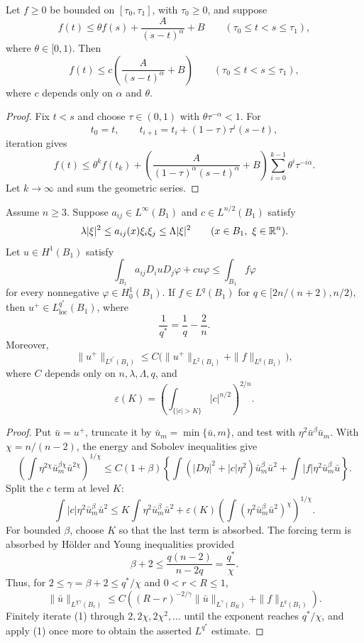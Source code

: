\begin{lemma}\label{hanlin:weaksol-part2-iteration-lemma}
Let $f\geq0$ be bounded on $[\tau_0,\tau_1]$, with $\tau_0\geq0$, and
suppose
\[
f(t)\leq\theta f(s)+\frac{A}{(s-t)^\alpha}+B
\qquad(\tau_0\leq t<s\leq\tau_1),
\]
where $\theta\in[0,1)$. Then
\[
f(t)\leq c\left(\frac{A}{(s-t)^\alpha}+B\right)
\qquad(\tau_0\leq t<s\leq\tau_1),
\]
where $c$ depends only on $\alpha$ and $\theta$.
\end{lemma}
\begin{proof}
\sketch Fix $t<s$ and choose $\tau\in(0,1)$ with
$\theta\tau^{-\alpha}<1$. For
\[
t_0=t,\qquad
t_{i+1}=t_i+(1-\tau)\tau^i(s-t),
\]
iteration gives
\[
f(t)\leq\theta^kf(t_k)+
\left(\frac{A}{(1-\tau)^\alpha(s-t)^\alpha}+B\right)
\sum_{i=0}^{k-1}\theta^i\tau^{-i\alpha}.
\]
Let $k\to\infty$ and sum the geometric series.
\end{proof}

\begin{theorem}\label{hanlin:weaksol-part2-high-integrability}
Assume $n\geq3$. Suppose $a_{ij}\in L^\infty(B_1)$ and
$c\in L^{n/2}(B_1)$ satisfy
\[
\lambda|\xi|^2\leq a_{ij}(x)\xi_i\xi_j\leq\Lambda|\xi|^2
\qquad(x\in B_1,\ \xi\in\mathbb{R}^n).
\]
Let $u\in H^1(B_1)$ satisfy
\[
\int_{B_1}a_{ij}D_i uD_j\varphi+cu\varphi
\leq\int_{B_1}f\varphi
\]
for every nonnegative $\varphi\in H^1_0(B_1)$. If
$f\in L^q(B_1)$ for
$q\in[2n/(n+2),n/2)$, then
$u^+\in L^{q^*}_{\mathrm{loc}}(B_1)$, where
\[
\frac1{q^*}=\frac1q-\frac2n.
\]
Moreover,
\[
\|u^+\|_{L^{q^*}(B_1)}
\leq C\bigl(\|u^+\|_{L^2(B_1)}+\|f\|_{L^q(B_1)}\bigr),
\]
where $C$ depends only on $n,\lambda,\Lambda,q$, and
\[
\varepsilon(K)=
\left(\int_{\{|c|>K\}}|c|^{n/2}\right)^{2/n}.
\]
\end{theorem}
\begin{proof}
\sketch Put $\bar u=u^+$, truncate it by
$\bar u_m=\min\{\bar u,m\}$, and test with
$\eta^2\bar u^\beta\bar u_m$. With $\chi=n/(n-2)$, the energy and Sobolev
inequalities give
\[
\left(\int\eta^{2\chi}\bar u_m^{\beta\chi}\bar u^{2\chi}
\right)^{1/\chi}
\leq C(1+\beta)\left\{
\int(|D\eta|^2+|c|\eta^2)\bar u_m^\beta\bar u^2
+\int|f|\eta^2\bar u_m^\beta\bar u\right\}.
\]
Split the $c$ term at level $K$:
\[
\int|c|\eta^2\bar u_m^\beta\bar u^2
\leq K\int\eta^2\bar u_m^\beta\bar u^2
+\varepsilon(K)
\left(\int(\eta^2\bar u_m^\beta\bar u^2)^\chi\right)^{1/\chi}.
\]
For bounded $\beta$, choose $K$ so that the last term is absorbed. The
forcing term is absorbed by H\"older and Young inequalities provided
\[
\beta+2\leq\frac{q(n-2)}{n-2q}=\frac{q^*}{\chi}.
\]
Thus, for $2\leq\gamma=\beta+2\leq q^*/\chi$ and $0<r<R\leq1$,
\[
\|\bar u\|_{L^{\chi\gamma}(B_r)}
\leq C\left((R-r)^{-2/\gamma}
\|\bar u\|_{L^\gamma(B_R)}+\|f\|_{L^q(B_1)}\right).
\tag{1}
\]
Finitely iterate (1) through $2,2\chi,2\chi^2,\ldots$ until the exponent
reaches $q^*/\chi$, and apply (1) once more to obtain the asserted
$L^{q^*}$ estimate.
\end{proof}

